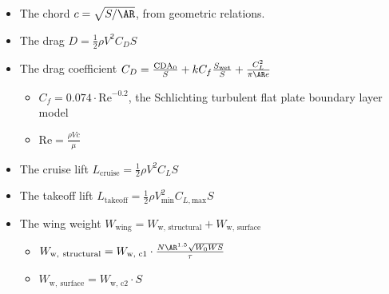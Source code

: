 \begin{example}
    \begin{itemize}[noitemsep]
        \item The chord $c = \sqrt{S / \AR}$, from geometric relations.
        \item The drag $D = \frac{1}{2} \rho V^2 C_D S$
        \item The drag coefficient $C_D = \frac{\mathrm{CDA}_0}{S} + k C_f \frac{S_\text{wet}}{S} + \frac{C_L^2}{\pi \AR e}$
        \begin{itemize}[noitemsep]
            \item $C_f = 0.074 \cdot \text{Re}^{-0.2}$, the Schlichting turbulent flat plate boundary layer model
            \item $\text{Re} = \frac{\rho V c}{\mu}$
        \end{itemize}
        \item The cruise lift $L_\text{cruise}=\frac{1}{2}\rho V^2 C_L S$
        \item The takeoff lift $L_\text{takeoff}=\frac{1}{2}\rho V_\text{min}^2 C_{L, \text{max}} S$
        \item The wing weight $W_{\text{wing}}= W_\text{w, structural} + W_\text{w, surface}$
        \begin{itemize}[noitemsep]
            \item $W_\mathrm{w,\ structural} = W_\text{w, c1} \cdot \frac{N \AR^{1.5} \sqrt{W_0 W S}}{\tau}$
            \item $W_\mathrm{w,\ surface} = W_\text{w, c2} \cdot S$
        \end{itemize}
    \end{itemize}


\end{example}
